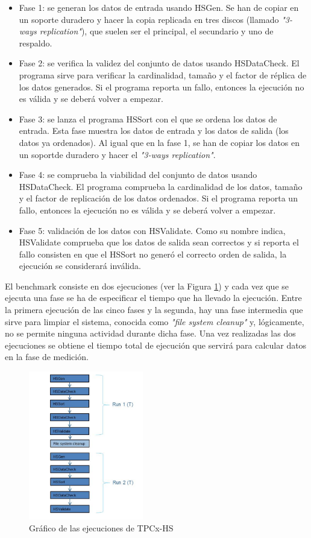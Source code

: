 \documentclass[10pt]{article}
\begin{document}
		\begin{itemize}
			\item Fase 1: se generan los datos de entrada usando HSGen. Se han de copiar en un soporte duradero y hacer la copia replicada en tres discos (llamado \textit{"3-ways replication"}), que suelen ser el principal, el secundario y uno de respaldo\cite{replication}.
			\item Fase 2: se verifica la validez del conjunto de datos usando HSDataCheck. El programa sirve para verificar la cardinalidad, tamaño y el factor de réplica de los datos generados. Si el programa reporta un fallo, entonces la ejecución no es válida y se deberá volver a empezar.
			\item Fase 3: se lanza el programa HSSort con el que se ordena los datos de entrada. Esta fase muestra los datos de entrada y los datos de salida (los datos ya ordenados). Al igual que en la fase 1, se han de copiar los datos en un soportde duradero y hacer el \textit{"3-ways replication"}.
			\item Fase 4: se comprueba la viabilidad del conjunto de datos usando HSDataCheck. El programa comprueba la cardinalidad de los datos, tamaño y el factor de replicación de los datos ordenados. Si el programa reporta un fallo, entonces la ejecución no es válida y se deberá volver a empezar.
			\item Fase 5: validación de los datos con HSValidate. Como su nombre indica, HSValidate comprueba que los datos de salida sean correctos y si reporta el fallo consisten en que el HSSort no generó el correcto orden de salida, la ejecución se considerará inválida.
		\end{itemize}
		
		El benchmark consiste en dos ejecuciones (ver la Figura \ref{fig:ejecucionesTPC}) y cada vez que se ejecuta una fase se ha de especificar el tiempo que ha llevado la ejecución. Entre la primera ejecución de las cinco fases y la segunda, hay una fase intermedia que sirve para limpiar el sistema, conocida como \textit{"file system cleanup"} y, lógicamente, no se permite ninguna actividad durante dicha fase. Una vez realizadas las dos ejecuciones se obtiene el tiempo total de ejecución que servirá para calcular datos en la fase de medición.
		
		\begin{figure}[h]
			\centering
			\includegraphics[width=5cm]{./images/executionsTPC.png}
			\caption{Gráfico de las ejecuciones de TPCx-HS} 
			\label{fig:ejecucionesTPC}
		\end{figure}
		
\end{document}
